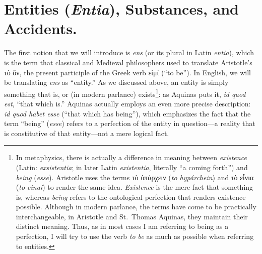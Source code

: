 \documentclass[
  12pt,
]{memoir}
\begin{document}
\section{\texorpdfstring{Entities (\emph{Entia}), Substances, and
Accidents.}{Entities (Entia), Substances, and Accidents.}}\label{entities-entia-substances-and-accidents.}

The first notion that we will introduce is \emph{ens} (or its plural in
Latin \emph{entia}), which is the term that classical and Medieval
philosophers used to translate Aristotle's τὸ ὄν, the present participle
of the Greek verb εἰμί (``to be''). In English, we will be translating
\emph{ens} as ``entity.'' As we discussed above, an entity is simply
something that is, or (in modern parlance) exists\footnote{In
  metaphysics, there is actually a difference in meaning between
  \emph{existence} (Latin: \emph{exsistentia}; in later Latin
  \emph{existentia}, literally ``a coming forth'') and \emph{being}
  (\emph{esse}). Aristotle uses the terms τὸ ὑπάρχειν (\emph{to
  hypárchein}) and τὸ εἶνια (\emph{to eînai}) to render the same idea.
  \emph{Existence} is the mere fact that something is, whereas
  \emph{being} refers to the ontological perfection that renders
  existence possible. Although in modern parlance, the terms have come
  to be practically interchangeable, in Aristotle and St.~Thomas
  Aquinas, they maintain their distinct meaning. Thus, as in most cases
  I am referring to being as a perfection, I will try to use the verb
  \emph{to be} as much as possible when referring to entities.}: as
Aquinas puts it, \emph{id quod est}, ``that which is.'' Aquinas actually
employs an even more precise description: \emph{id quod habet esse}
(``that which has being''), which emphasizes the fact that the term
``being'' (\emph{esse}) refers to a perfection of the entity in
question---a reality that is constitutive of that entity---not a mere
logical fact.
\end{document}

